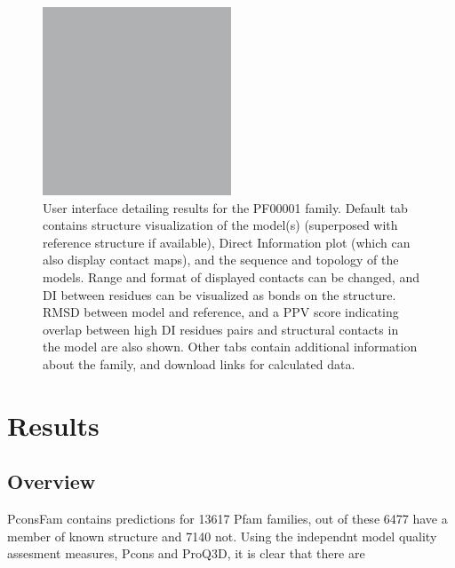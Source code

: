 \documentclass[a4,center,fleqn]{NAR}
\begin{document}
\begin{figure}[t]
\begin{center}
    \includegraphics[width=0.5\textwidth]{figures/presentation.png}
\end{center}
\caption{User interface detailing results for the PF00001 family. Default tab contains structure
visualization of the model(s) (superposed with reference structure if available), Direct Information plot 
(which can also display contact maps), and the sequence and topology of the models. Range and format of displayed contacts can be changed, and DI between residues can be visualized as bonds on the structure.
RMSD between model and reference, and a PPV score indicating overlap between high DI residues pairs and structural contacts in the model are also shown. Other tabs contain additional information about the family, and download links for calculated data.}
\label{fig:interface}
\end{figure}

\section{Results}



\subsection{Overview}

PconsFam contains predictions for 13617 Pfam families, out of these
6477 have a member of known structure and  7140 not.  Using the
independnt model quality assesment measures, Pcons and ProQ3D, it is
clear that there are 
\end{document}
